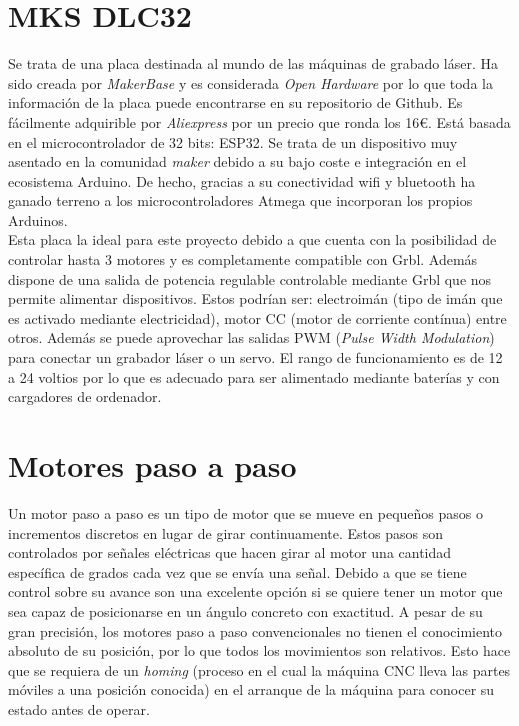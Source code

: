 \section{MKS DLC32}
\label{sec:mksdlc32}
Se trata de una placa destinada al mundo de las máquinas de grabado láser. Ha sido creada por \textit{MakerBase} y es considerada 
\textit{Open Hardware} por lo que toda la información de la placa puede encontrarse en su repositorio de Github. Es fácilmente adquirible por 
\textit{Aliexpress} por un precio que ronda los 16\euro. Está basada en el microcontrolador de 32 bits: ESP32. Se trata de un dispositivo muy asentado
en la comunidad \textit{maker} debido a su bajo coste e integración en el ecosistema Arduino. De hecho, gracias a su conectividad wifi y bluetooth ha ganado 
terreno a los microcontroladores Atmega que incorporan los propios Arduinos.\\
Esta placa la ideal para este proyecto debido a que cuenta con la posibilidad de controlar 
hasta 3 motores y es completamente compatible con Grbl. Además dispone de una salida de potencia regulable controlable mediante Grbl que nos 
permite alimentar dispositivos. Estos podrían ser: electroimán (tipo de imán que es activado mediante electricidad), motor CC (motor de corriente 
contínua) entre otros. Además se puede aprovechar las salidas PWM (\textit{Pulse Width Modulation}) para conectar un grabador láser o un servo. 
El rango de funcionamiento es de 12 a 24 voltios por lo que es adecuado para ser alimentado mediante baterías y con cargadores de ordenador. 

\section{Motores paso a paso}
\label{sec:motores}
Un motor paso a paso es un tipo de motor que se mueve en pequeños pasos o incrementos discretos en lugar de girar continuamente. Estos pasos 
son controlados por señales eléctricas que hacen girar al motor una cantidad específica de grados cada vez que se envía una señal. Debido a que se tiene 
control sobre su avance son una excelente opción si se quiere tener un motor que sea capaz de posicionarse en un ángulo concreto con exactitud. A pesar
de su gran precisión, los motores paso a paso convencionales no tienen el conocimiento absoluto de su posición, por lo que todos los movimientos son 
relativos. Esto hace que se requiera de un \textit{homing} (proceso en el cual la máquina CNC lleva las partes móviles a una 
posición conocida) en el arranque de la máquina para conocer su estado antes de operar.

